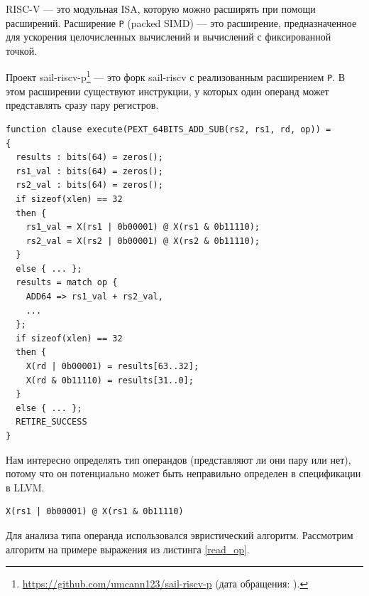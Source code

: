 RISC-V --- это модульная ISA, которую можно расширять при помощи расширений.
Расширение \texttt{P} (packed SIMD) --- это расширение, предназначенное для ускорения целочисленных вычислений и вычислений с фиксированной точкой.

Проект sail-riscv-p\footnote{\url{https://github.com/umcann123/sail-riscv-p} (дата обращения: ).} --- это форк sail-riscv с реализованным расширением \texttt{P}.
В этом расширении существуют инструкции, у которых один операнд может представлять сразу пару регистров.

\begin{lstlisting}[caption={Пример \texttt{execute} функции, задающей семантику исполнения инструкциям, которые работают с парами регистров}, language=sail, label=depxlen, frame=single]
function clause execute(PEXT_64BITS_ADD_SUB(rs2, rs1, rd, op)) =
{
  results : bits(64) = zeros();
  rs1_val : bits(64) = zeros();
  rs2_val : bits(64) = zeros();
  if sizeof(xlen) == 32
  then {
    rs1_val = X(rs1 | 0b00001) @ X(rs1 & 0b11110);
    rs2_val = X(rs2 | 0b00001) @ X(rs2 & 0b11110);
  }
  else { ... };
  results = match op {
    ADD64 => rs1_val + rs2_val,
    ...
  };
  if sizeof(xlen) == 32
  then {
    X(rd | 0b00001) = results[63..32];
    X(rd & 0b11110) = results[31..0];
  }
  else { ... };
  RETIRE_SUCCESS
}
\end{lstlisting}


Нам интересно определять тип операндов (представляют ли они пару или нет), потому что он потенциально может быть неправильно определен в спецификации в LLVM.

\begin{lstlisting}[caption={Пример выражения, в котором происходит чтение и конкатенация значений из парных регистров}, language=sail, label=read_op]
X(rs1 | 0b00001) @ X(rs1 & 0b11110)
\end{lstlisting}

Для анализа типа операнда использовался эвристический алгоритм. Рассмотрим алгоритм на примере выражения из листинга \ref{read_op}.

